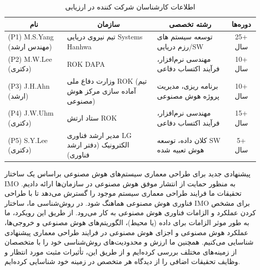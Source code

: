\documentclass[a4paper,10pt]{article}
\begin{document}
    \newpage


    \begin{table}
                        
        \centering
        \caption{اطلاعات کارشناسان شرکت کننده در ارزیابی}
        \begin{tabularx}{\textwidth}{ p{4.5cm} p{5cm} p{6cm} c }
            
            \hline

            \multicolumn{1}{c}{نام} & \multicolumn{1}{c}{سازمان} & \multicolumn{1}{c}{رشته تخصصی} & \multicolumn{1}{c}{دوره‌ها} \\

            \hline

            (P1) M.S.Yang (مهندس ارشد) & تیم نیروی دریایی Systems Hanhwa & توسعه سیستم های رزم دریایی/SW & 25+ سال \\
            (P2) M.W.Lee (دکتری) & ROK DAPA	 & مهندسی نرم‌افزار، فرآیند اکتساب دفاعی & 10+ سال \\
            (P3) J.H.Ahn (ارشد) & وزارت دفاع ملی ROK (تیم آماده سازی مرکز هوش مصنوعی) & برنامه ریزی، مدیریت پروژه هوش مصنوعی & 10+ سال \\
            (P4) J.W.Uhm (دکتری) & ستاد ارتش ROK & مهندسی نرم‌افزار، فرآیند اکتساب دفاعی & 15+ سال \\
            (P5) S.Y.Lee (دکتری) & مدیر ارشد فناوری LG الکترونیک (دفتر ارشد فناوری) & کلان داده، توسعه SW هوش تعبیه شده & 5+ سال \\

            \hline

        \end{tabularx}

    \end{table}

    \newpage


    پیشنهادی جدید برای طراحی معماری سیستم‌های هوش مصنوعی براساس یک ساختار IMO به منظور حمایت از انتشار موفق هوش مصنوعی در سازمان‌ها ارائه دادیم. تحقیقات ما فرایند طراحی معماری سیستم موجود را گسترش می‌دهد تا با طراحی فناوری هوش مصنوعی هماهنگ شود. در روش‌شناسی ما، ساختار IMO برای مشخص کردن عملکرد و الزامات فناوری هوش مصنوعی به کار می‌رود. از طریق این رویکرد، ما به طور موثر الزامات برای داده (یا محیط)، الگوریتم‌های هوش مصنوعی و خروجی‌ها، عملکرد هوش مصنوعی و اجزای هوش مصنوعی در فرایند طراحی معماری پیشنهادی شناسایی می‌کنیم. همچنین ما ارزش و محدودیت‌های روش‌شناسی خود را با متخصصان از زمینه‌های مختلف بررسی کرده‌ایم و از طریق این، تأثیرات مثبت مورد انتظار و وظایف تحقیقات اضافی را از دیدگاه هر متخصص در زمینه خود شناسایی کرده‌ایم.
\end{document}
